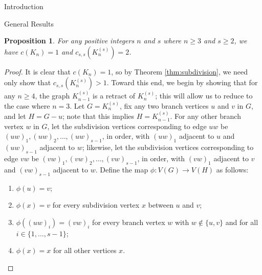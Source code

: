 \documentclass[12pt]{amsart}
\newtheorem{proposition}[lemma]{Proposition}
\theoremstyle{definition}
\newcommand{\speeds}{c_{s,s}}
\begin{document}
\begin{section}{Introduction}
\begin{section}{General Results}
\begin{proposition}\label{prop:complete_subdivision}
For any positive integers $n$ and $s$ where $n\ge 3$ and $s\ge 2$, we have $c(K_n)=1$ and $\speeds(K_n^{(s)}) = 2$.
\end{proposition}
\begin{proof}
It is clear that $c(K_n) = 1$, so by Theorem \ref{thm:subdivision}, we need only show that $\speeds(K_n^{(s)}) > 1$.  Toward this end, we begin by showing that for any $n\ge 4$, the graph $K_{n-1}^{(s)}$ is a retract of $K_n^{(s)}$; this will allow us to reduce to the case where $n=3$.  Let $G = K_n^{(s)}$, fix any two branch vertices $u$ and $v$ in $G$, and let $H = G-u$; note that this implies $H = K_{n-1}^{(s)}$.  For any other branch vertex $w$ in $G$, let the subdivision vertices corresponding to edge $uw$ be $(uw)_1, (uw)_2, \dots, (uw)_{s-1}$, in order, with $(uw)_1$ adjacent to $u$ and $(uw)_{s-1}$ adjacent to $w$; likewise, let the subdivision vertices corresponding to edge $vw$ be $(vw)_1, (vw)_2, \dots, (vw)_{s-1}$, in order, with $(vw)_1$ adjacent to $v$ and $(vw)_{s-1}$ adjacent to $w$.  Define the map $\phi: V(G)\to V(H)$ as follows:
\begin{enumerate}[label=(\alph*)]
    \item
        $\phi(u)=v$;
    \item
        $\phi(x) = v$ for every subdivision vertex $x$ between $u$ and $v$;
    \item
        $\phi((uw)_i) = (vw)_i$ for every branch vertex $w$ with $w \not \in \{u,v\}$ and for all $i \in \{1, \dots, s-1\}$;
    \item
        $\phi(x)=x$ for all other vertices $x$.
\end{enumerate}


\end{proof}
\end{section}
\end{section}
\end{document}
